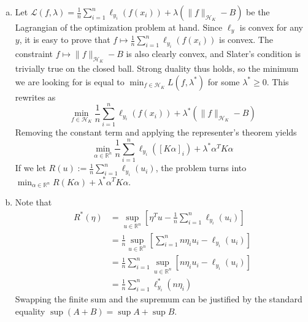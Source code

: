 \documentclass[a4paper,11pt, hidelinks]{article}
\begin{document}
\begin{enumerate}[a.]
  \item Let $\displaystyle \mathcal L(f,\lambda) = \frac 1n \sum_{i=1}^n \ell_{y_i}(f(x_i)) + \lambda(\|f\|_{\mathcal H_K}-B)$ be the Lagrangian of the optimization problem at hand. Since $\ell_y$ is convex for any $y$, it is easy to prove that $f\mapsto \frac 1n \sum_{i=1}^n \ell_{y_i}(f(x_i))$ is convex. The constraint $f\mapsto \|f\|_{\mathcal H_K}-B$ is also clearly convex, and Slater's condition is trivially true on the closed ball. Strong duality thus holds, so the minimum we are looking for is equal to $\min_{f\in \mathcal H_K}L(f,\lambda^*)$ for some $\lambda^*\geq 0$. This rewrites as $$\min_{f\in \mathcal H_K} \frac 1n \sum_{i=1}^n \ell_{y_i}(f(x_i)) + \lambda^*(\|f\|_{\mathcal H_K}-B) $$
  Removing the constant term and applying the representer's theorem yields 
  $$\min_{\alpha \in \mathbb{R}^n} \frac{1}{n}\sum_{i=1}^{n} \ell_{y_i}([K \alpha]_i) + \lambda^* \alpha^T K \alpha$$
  If we let $\displaystyle R(u) := \frac{1}{n}\sum_{i=1}^{n}\ell_{y_i}(u_i)$, the problem turns into
  $\min_{\alpha \in \mathbb{R}^n} R(K \alpha) + \lambda^* \alpha^T K \alpha $.

  \item Note that $$\begin{aligned}
    R^*(\eta) &= \sup_{u\in \mathbb R^n}\left[\eta^Tu - \frac 1n \sum_{i=1}^n \ell_{y_i}(u_i) \right] \\
    &= \frac 1n \sup_{u\in \mathbb R^n}\left[\sum_{i=1}^n n \eta_i u_i - \ell_{y_i}(u_i) \right]\\
    &= \frac 1n \sum_{i=1}^n \sup_{u\in \mathbb R^n}\left[ n \eta_i u_i - \ell_{y_i}(u_i) \right]\\
    &= \frac 1n \sum_{i=1}^n \ell_{y_i}^*(n\eta_i)
  \end{aligned}$$
  Swapping the finite sum and the supremum can be justified by the standard equality $\sup(A+B) = \sup A + \sup B$.


\end{enumerate}
\end{document}
